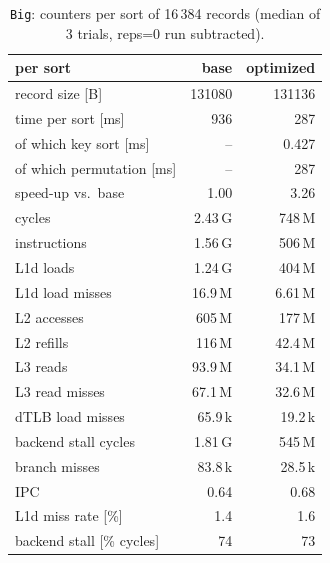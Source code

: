 \begin{table}[htbp]\centering\small
\begin{tabular}{lrr}
\toprule
per sort & base & optimized \\
\midrule
record size [B] & 131080 & 131136 \\
time per sort [ms] & 936 & 287 \\
\quad of which key sort [ms] & -- & 0.427 \\
\quad of which permutation [ms] & -- & 287 \\
speed-up vs.\ base & 1.00 & 3.26 \\
cycles & 2.43\,G & 748\,M \\
instructions & 1.56\,G & 506\,M \\
L1d loads & 1.24\,G & 404\,M \\
L1d load misses & 16.9\,M & 6.61\,M \\
L2 accesses & 605\,M & 177\,M \\
L2 refills & 116\,M & 42.4\,M \\
L3 reads & 93.9\,M & 34.1\,M \\
L3 read misses & 67.1\,M & 32.6\,M \\
dTLB load misses & 65.9\,k & 19.2\,k \\
backend stall cycles & 1.81\,G & 545\,M \\
branch misses & 83.8\,k & 28.5\,k \\
IPC & 0.64 & 0.68 \\
L1d miss rate [\%] & 1.4 & 1.6 \\
backend stall [\% cycles] & 74 & 73 \\
\bottomrule
\end{tabular}
\caption{\texttt{Big}: counters per sort of 16\,384 records (median of 3 trials, reps=0 run subtracted).}\label{tab:big16384}
\end{table}
